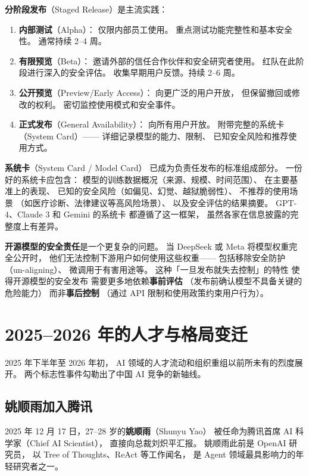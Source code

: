 \textbf{分阶段发布}（Staged Release）是主流实践：
\begin{enumerate}[noitemsep]
  \item \textbf{内部测试}（Alpha）：
        仅限内部员工使用。
        重点测试功能完整性和基本安全性。
        通常持续 2--4 周。
  \item \textbf{有限预览}（Beta）：
        邀请外部的信任合作伙伴和安全研究者使用。
        红队在此阶段进行深入的安全评估。
        收集早期用户反馈。持续 2--6 周。
  \item \textbf{公开预览}（Preview/Early Access）：
        向更广泛的用户开放，
        但保留撤回或修改的权利。
        密切监控使用模式和安全事件。
  \item \textbf{正式发布}（General Availability）：
        向所有用户开放。
        附带完整的系统卡（System Card）——
        详细记录模型的能力、限制、
        已知安全风险和推荐使用方式。
\end{enumerate}

\textbf{系统卡}（System Card / Model Card）
已成为负责任发布的标准组成部分。
一份好的系统卡应包含：
模型的训练数据概况（来源、规模、时间范围）、
在主要基准上的表现、
已知的安全风险（如偏见、幻觉、越狱脆弱性）、
不推荐的使用场景
（如医疗诊断、法律建议等高风险场景）、
以及安全评估的结果摘要。
GPT-4、Claude 3 和 Gemini 的系统卡
都遵循了这一框架，
虽然各家在信息披露的完整度上有差异。

\textbf{开源模型的安全责任}是一个更复杂的问题。
当 DeepSeek 或 Meta 将模型权重完全公开时，
他们无法控制下游用户如何使用这些权重——
包括移除安全防护（un-aligning）、
微调用于有害用途等。
这种「一旦发布就失去控制」的特性
使得开源模型的安全发布
需要更多地依赖\textbf{事前评估}
（发布前确认模型不具备关键的危险能力）
而非\textbf{事后控制}
（通过 API 限制和使用政策约束用户行为）。

\section{2025--2026 年的人才与格局变迁}

2025 年下半年至 2026 年初，
AI 领域的人才流动和组织重组以前所未有的烈度展开。
两个标志性事件勾勒出了中国 AI 竞争的新轴线。

\subsection{姚顺雨加入腾讯}

2025 年 12 月 17 日，27--28 岁的\textbf{姚顺雨}（Shunyu Yao）
被任命为腾讯首席 AI 科学家（Chief AI Scientist），
直接向总裁刘炽平汇报。
姚顺雨此前是 OpenAI 研究员，
以 Tree of Thoughts、ReAct 等工作闻名，
是 Agent 领域最具影响力的年轻研究者之一。


